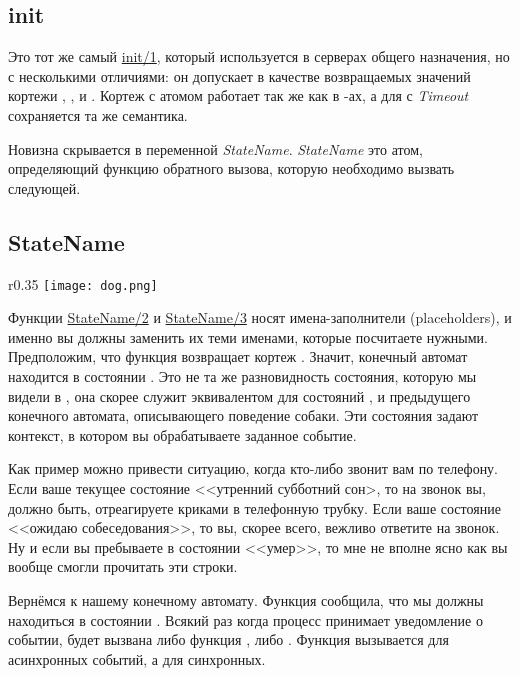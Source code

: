 \subsection{init}
\label{init2}
Это тот же самый \href{http://erldocs.com/R15B/stdlib/gen\_fsm.html\#init/1}{init/1}, который используется в серверах общего назначения, но с несколькими отличиями: он допускает в качестве возвращаемых значений кортежи , ,  и .
Кортеж с атомом  работает так же как в \--ах, а для  с \emph{Timeout} сохраняется та же семантика.

Новизна скрывается в переменной \emph{StateName}.
\emph{StateName} это атом, определяющий функцию обратного вызова, которую необходимо вызвать следующей.
\subsection{StateName}
\label{statename}
\begin{wrapfigure}{r}{0.35\linewidth}
    \texttt{[image: dog.png]}
\end{wrapfigure}
Функции \href{http://erldocs.com/R15B/stdlib/gen\_fsm.html\#StateName/2}{StateName/2} и \href{http://erldocs.com/R15B/stdlib/gen\_fsm.html\#StateName/2}{StateName/3} носят имена\--заполнители (placeholders), и именно вы должны заменить их теми именами, которые посчитаете нужными.
Предположим, что функция  возвращает кортеж .
Значит, конечный автомат находится в состоянии .
Это не та же разновидность состояния, которую мы видели в , она скорее служит эквивалентом для состояний ,  и  предыдущего конечного автомата, описывающего поведение собаки.
Эти состояния задают контекст, в котором вы обрабатываете заданное событие.

Как пример можно привести ситуацию, когда кто\--либо звонит вам по телефону.
Если ваше текущее состояние <<утренний субботний сон>, то на звонок вы, должно быть, отреагируете криками в телефонную трубку.
Если ваше состояние <<ожидаю собеседования>>, то вы, скорее всего, вежливо ответите на звонок.
Ну и если вы пребываете в состоянии <<умер>>, то мне не вполне ясно как вы вообще смогли прочитать эти строки.

Вернёмся к нашему конечному автомату.
Функция  сообщила, что мы должны находиться в состоянии .
Всякий раз когда процесс  принимает уведомление о событии, будет вызвана либо функция , либо .
Функция  вызывается для асинхронных событий, а  для синхронных.

